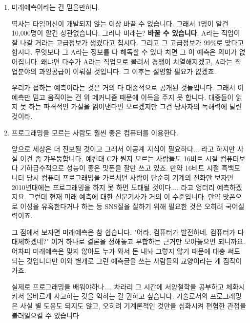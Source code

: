 \begin{enumerate}

    \item 미래예측이라는 건 믿을만하나.
    \vspace{5mm}

    역사는 타임머신이 개발되지 않는 이상 바꿀 수 없습니다.
    그래서 1명이 알건 10,000명이 알건 상관없습니다.
    그러나 미래는? \textbf{바꿀 수 있습니다}.
    A라는 직업이 잘 나갈 거라는 고급정보가 생겼다고 칩시다. 그리고 그 고급정보가 99$\%$로 맞다고 합시다.
    무엇보다 그 A라는 정보를 다 해독할 수 있다 치면 그 이 예측은 의미가 없어집니다.
    왜냐면 다수가 A라는 직업으로 몰려서 경쟁이 치열해지겠고, A라는 직업분야의 과잉공급이 이뤄질 것입니다.
    그 이후는 설명할 필요가 없겠죠.
    \vspace{5mm}

    우리가 접하는 예측이라는 것은 거의 다 대중적으로 공개된 것들입니다.
    그래서 이 예측만 믿고 움직이는 건 위 메커니즘 때문에 이득을 주지 못 합니다.
    대중들이 읽지 못 하는 파격적인 가설을 읽어낸다면 모르겠지만 그건 당사자의 독해력에 달린 것이라.
    \vspace{5mm}

    \item 프로그래밍을 모르는 사람도 훨씬 좋은 컴퓨터를 이용한다.
    \vspace{5mm}

    앞으로 세상은 더 진보될 것이고 그래서 이공계 지식이 필요하다... 라고 하지만 사실 이건 좀 갸우뚱합니다.
    예컨대 C가 뭔지 모르는 사람들도 16비트 시절 컴퓨터보다 기하급수적으로 성능이 좋은 맛폰을 잘만 쓰고 있죠.
    만약 16비트 시절 흑백모니터 당시 컴퓨터 프로그래밍을 가르치던 사람이 단순히 기계의 진화만 보자면
    2010년대에는 프로그래밍을 하지 못 하면 도태될 것이다.... 라고 엉터리 예측하겠지요.
    그런데 현재 미래 예측에 대한 신문기사가 거의 이 수준입니다.
    만약 맛폰으로 이성을 유혹한다거나 하는 등 SNS질을 잘하기 위해 필요한 것은 오히려 국어실력이죠.
    \vspace{5mm}

    그 점에서 보자면 미래예측은 참 쉽습니다.
    "어라, 컴퓨터가 발전하네. 컴퓨터가 다 대체하겠네?" 이거 하나로 결론을 정해놓고 부합하는 근거만 모아놓으면 되니까요.
    어차피 미래예측은 맞지 않아도 누가 와서 돈 내놔 그렇지 않기 때문에 대충 써도 되는 것입니다만
    이와 별개로 그런 예측글을 쓰는 사람들의 교양이라는 게 짐작이 가죠.
    \vspace{5mm}

    실제로 프로그래밍을 배워야하나.... 차라리 그 시간에 서양철학을 공부하고 체화시켜서 올바르게 사고하는 것을 익히는 걸 권하고 싶습니다.
    기술로서의 프로그래밍은 사실 별 도움도 되지도 않고, 오히려 기계론적인 것만을 심화시켜 편협한 관점을 불러일으킬 수 있습니다
    \vspace{5mm}


\end{enumerate}
